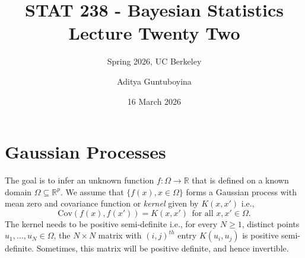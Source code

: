 \documentclass{scrartcl}
\newcommand{\R}{{\mathbb R}}
\begin{document}
\title{STAT 238 - Bayesian Statistics  \\
  Lecture Twenty Two} 
\subtitle{Spring 2026, UC Berkeley}

\author{Aditya Guntuboyina}


\date{16 March 2026}

\maketitle

\section{Gaussian Processes}
The goal is to infer an unknown function $f : \Omega \rightarrow \R$
that is defined on a known domain $\Omega \subseteq \R^p$. We assume
that $\{f(x), x \in \Omega\}$ forms a Gaussian process with mean zero
and covariance function or \textit{kernel} given by $K(x, x')$ i.e., 
\begin{equation*}
  \text{Cov}(f(x), f(x')) = K(x, x') ~~ \text{for all $x, x' \in
    \Omega$}. 
\end{equation*}
The kernel needs to be positive semi-definite i.e., for every $N \geq
1$, distinct points $u_1, \dots, u_N \in \Omega$, the $N \times N$
matrix with $(i, j)^{th}$ entry $K(u_i, u_j)$ is positive 
semi-definite. Sometimes, this matrix will be positive definite, and
hence invertible.
\end{document}
